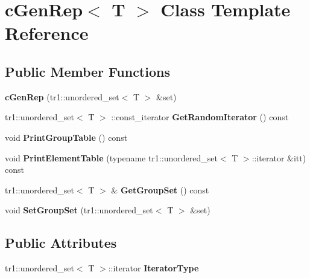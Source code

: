 \hypertarget{classcGenRep}{\section{c\-Gen\-Rep$<$ \-T $>$ \-Class \-Template \-Reference}
\label{classcGenRep}
}
\subsection*{\-Public \-Member \-Functions}
\begin{DoxyCompactItemize}
\item 
\hypertarget{classcGenRep_afc45eb5aac4afa26288e4ef1b6dc3c52}{{\bfseries c\-Gen\-Rep} (tr1\-::unordered\-\_\-set$<$ \-T $>$ \&set)}\label{classcGenRep_afc45eb5aac4afa26288e4ef1b6dc3c52}

\item 
\hypertarget{classcGenRep_afb8d7535bcd9e4fda83eceb2a2633c2c}{tr1\-::unordered\-\_\-set$<$ \-T $>$\*
\-::const\-\_\-iterator {\bfseries \-Get\-Random\-Iterator} () const }\label{classcGenRep_afb8d7535bcd9e4fda83eceb2a2633c2c}

\item 
\hypertarget{classcGenRep_a9c5f078f3021dc2f8d2741bd9847146d}{void {\bfseries \-Print\-Group\-Table} () const }\label{classcGenRep_a9c5f078f3021dc2f8d2741bd9847146d}

\item 
\hypertarget{classcGenRep_a029b8b6099452ffd4dcab9e9ce79145b}{void {\bfseries \-Print\-Element\-Table} (typename tr1\-::unordered\-\_\-set$<$ \-T $>$\-::iterator \&itt) const }\label{classcGenRep_a029b8b6099452ffd4dcab9e9ce79145b}

\item 
\hypertarget{classcGenRep_aa94ce954bd3a2aabaa54d46642141df9}{tr1\-::unordered\-\_\-set$<$ \-T $>$ \& {\bfseries \-Get\-Group\-Set} () const }\label{classcGenRep_aa94ce954bd3a2aabaa54d46642141df9}

\item 
\hypertarget{classcGenRep_a38819c49300c51669a631399302ea130}{void {\bfseries \-Set\-Group\-Set} (tr1\-::unordered\-\_\-set$<$ \-T $>$ \&set)}\label{classcGenRep_a38819c49300c51669a631399302ea130}

\end{DoxyCompactItemize}
\subsection*{\-Public \-Attributes}
\begin{DoxyCompactItemize}
\item 
\hypertarget{classcGenRep_a94b066c9b99401b112085195c278b827}{tr1\-::unordered\-\_\-set$<$ \-T $>$\-::iterator {\bfseries \-Iterator\-Type}}\label{classcGenRep_a94b066c9b99401b112085195c278b827}

\end{DoxyCompactItemize}
